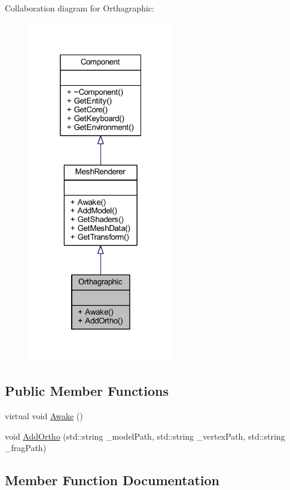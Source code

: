 Collaboration diagram for Orthagraphic\+:
\nopagebreak
\begin{figure}[H]
\begin{center}
\leavevmode
\includegraphics[width=181pt]{class_orthagraphic__coll__graph}
\end{center}
\end{figure}
\subsection*{Public Member Functions}
\begin{DoxyCompactItemize}
\item 
virtual void \mbox{\hyperlink{class_orthagraphic_a62f9d1b5d54623252bc3d15eba1e7181}{Awake}} ()
\item 
void \mbox{\hyperlink{class_orthagraphic_a7566bfec317c25a115d4d0b7debfb36c}{Add\+Ortho}} (std\+::string \+\_\+model\+Path, std\+::string \+\_\+vertex\+Path, std\+::string \+\_\+frag\+Path)
\end{DoxyCompactItemize}


\subsection{Member Function Documentation}
\mbox{\label{class_orthagraphic_a7566bfec317c25a115d4d0b7debfb36c}} 
